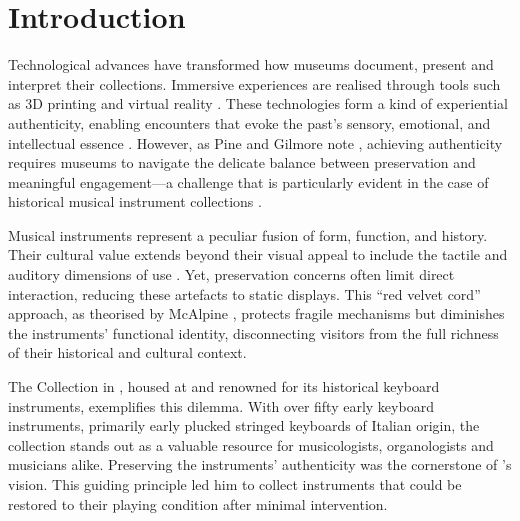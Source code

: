 \section{Introduction}\label{introduction}

Technological advances have transformed how museums document, present and interpret their collections. Immersive experiences are realised through tools such as 3D printing and virtual reality \cite{allard2005use,Wachowiak01082009,RCM_2024_3D,Kuzminsky_LaserScan_2012,Schaich_3D_2007}. These technologies form a kind of experiential authenticity, enabling encounters that evoke the past's sensory, emotional, and intellectual essence \cite{trant_Auth_1999}. However, as Pine and Gilmore note \cite{pinegilmore_2007}, achieving authenticity requires museums to navigate the delicate balance between preservation and meaningful engagement—a challenge that is particularly evident in the case of historical musical instrument collections \cite{McAlpine2014}.

Musical instruments represent a peculiar fusion of form, function, and history. Their cultural value extends beyond their visual appeal to include the tactile and auditory dimensions of use \cite{Fritz2017}. Yet, preservation concerns often limit direct interaction, reducing these artefacts to static displays. This ``red velvet cord'' approach, as theorised by McAlpine \cite{McAlpine2014}, protects fragile mechanisms but diminishes the instruments’ functional identity, disconnecting visitors from the full richness of their historical and cultural context.

The  Collection in , housed at  and renowned for its historical keyboard instruments, exemplifies this dilemma. With over fifty early keyboard instruments, primarily early plucked stringed keyboards of Italian origin, the collection stands out as a valuable resource for musicologists, organologists and musicians alike. Preserving the instruments' authenticity was the cornerstone of ’s vision. This guiding principle led him to collect instruments that could be restored to their playing condition after minimal intervention. 

